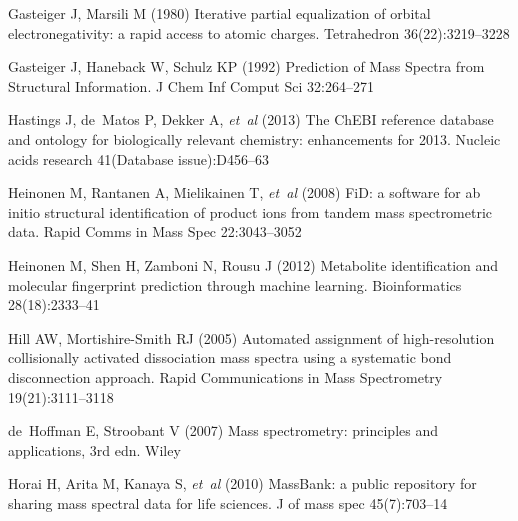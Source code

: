 \begin{thebibliography}{38}
Gasteiger J, Marsili M (1980) {Iterative partial equalization of orbital
  electronegativity: a rapid access to atomic charges}. Tetrahedron
  36(22):3219--3228

Gasteiger J, Haneback W, Schulz KP (1992) {Prediction of Mass Spectra from
  Structural Information}. J Chem Inf Comput Sci 32:264--271

Hastings J, de~Matos P, Dekker A, \emph{et~al} (2013) {The ChEBI reference
  database and ontology for biologically relevant chemistry: enhancements for
  2013.} Nucleic acids research 41(Database issue):D456--63

Heinonen M, Rantanen A, Mielikainen T, \emph{et~al}
  (2008) {FiD: a software for ab initio structural identification of product
  ions from tandem mass spectrometric data}. Rapid Comms in Mass Spec
  22:3043--3052

Heinonen M, Shen H, Zamboni N, Rousu J (2012) {Metabolite identification and
  molecular fingerprint prediction through machine learning.} Bioinformatics
  28(18):2333--41

Hill AW, Mortishire-Smith RJ (2005) {Automated assignment of high-resolution
  collisionally activated dissociation mass spectra using a systematic bond
  disconnection approach}. Rapid Communications in Mass Spectrometry
  19(21):3111--3118

de~Hoffman E, Stroobant V (2007) {Mass spectrometry: principles and
  applications}, 3rd edn. Wiley

Horai H, Arita M, Kanaya S, \emph{et~al} (2010) {MassBank: a public repository for
  sharing mass spectral data for life sciences.} J of mass spec 45(7):703--14


\end{thebibliography}
